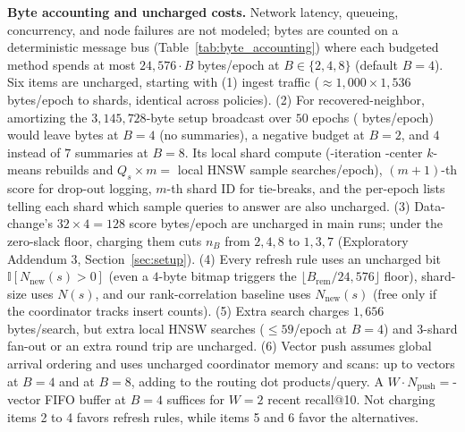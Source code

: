 \textbf{Byte accounting and uncharged costs.} Network latency, queueing, concurrency, and node failures are not modeled; bytes are counted on a deterministic message bus (Table~\ref{tab:byte_accounting}) where each budgeted method spends at most $24{,}576 \cdot B$ bytes/epoch at $B \in \{2, 4, 8\}$ (default $B = 4$). Six items are uncharged, starting with (1) ingest traffic ($\approx 1{,}000 \times 1{,}536$ bytes/epoch to shards, identical across policies). (2) For recovered-neighbor, amortizing the $3{,}145{,}728$-byte setup broadcast over $50$ epochs (\RNumRNSetupAmortEpochBytes{} bytes/epoch) would leave \RNumRNRemAfterAmortBFourBytes{} bytes at $B = 4$ (no summaries), a negative budget at $B = 2$, and $4$ instead of $7$ summaries at $B = 8$. Its local shard compute (\RNumKMeansIters{}-iteration \RNumCentersPerSummary{}-center $k$-means rebuilds and $Q_s \times m = {}$\RNumRNSampleSearchesPerEpoch{} local HNSW sample searches/epoch), $(m+1)$-th score for drop-out logging, $m$-th shard ID for tie-breaks, and the per-epoch lists telling each shard which sample queries to answer are also uncharged. (3) Data-change's $32 \times 4 = 128$ score bytes/epoch are uncharged in main runs; under the zero-slack floor, charging them cuts $n_B$ from $2, 4, 8$ to $1, 3, 7$ (Exploratory Addendum 3, Section~\ref{sec:setup}). (4) Every refresh rule uses an uncharged bit $\mathbb{I}[N_{\text{new}}(s) > 0]$ (even a $4$-byte bitmap triggers the $\lfloor B_{\text{rem}} / 24{,}576 \rfloor$ floor), shard-size uses $N(s)$, and our rank-correlation baseline uses $N_{\text{new}}(s)$ (free only if the coordinator tracks insert counts). (5) Extra search charges $1{,}656$ bytes/search, but extra local HNSW searches ($\le 59$/epoch at $B = 4$) and $3$-shard fan-out or an extra round trip are uncharged. (6) Vector push assumes global arrival ordering and uses uncharged coordinator memory and scans: up to \RNumPVMaxVecsBFour{} vectors at $B = 4$ and \RNumPVMaxVecsBEight{} at $B = 8$, adding \RNumPVDotProdRatioBFour{} to \RNumPVDotProdRatioBEight{} the \RNumRoutingDotProds{} routing dot products/query. A $W \cdot N_{\text{push}} = {}$\RNumPVFifoVecsBFour{}-vector FIFO buffer at $B = 4$ suffices for $W = 2$ recent recall@10. Not charging items 2 to 4 favors refresh rules, while items 5 and 6 favor the alternatives.
